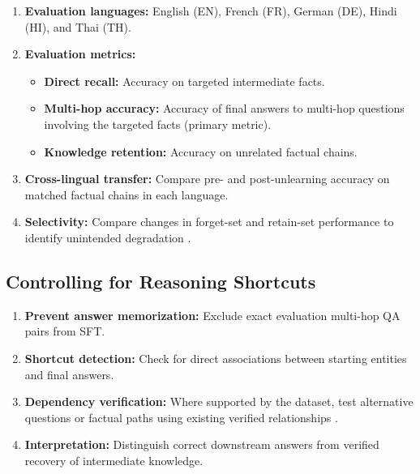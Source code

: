 \documentclass[10pt,a4paper]{article}
\begin{document}
\begin{enumerate}
    \item \textbf{Evaluation languages:}
    English (EN), French (FR), German (DE),
    Hindi (HI), and Thai (TH).

    \item \textbf{Evaluation metrics:}
    \begin{itemize}
        \item \textbf{Direct recall:}
        Accuracy on targeted intermediate facts.

        \item \textbf{Multi-hop accuracy:}
        Accuracy of final answers to multi-hop questions
        involving the targeted facts (primary metric).

        \item \textbf{Knowledge retention:}
        Accuracy on unrelated factual chains.
    \end{itemize}

    \item \textbf{Cross-lingual transfer:}
    Compare pre- and post-unlearning accuracy
    on matched factual chains in each language.

    \item \textbf{Selectivity:}
    Compare changes in forget-set and retain-set
    performance to identify unintended degradation
    \cite{maini2024tofu,thaker2025weak}.
\end{enumerate}


\subsection{Controlling for Reasoning Shortcuts}

\begin{enumerate}
    \item \textbf{Prevent answer memorization:}
    Exclude exact evaluation multi-hop QA pairs
    from SFT.

    \item \textbf{Shortcut detection:}
    Check for direct associations between
    starting entities and final answers.

    \item \textbf{Dependency verification:}
    Where supported by the dataset, test alternative
    questions or factual paths using existing
    verified relationships
    \cite{zhong2023mquake,yang2025socrates}.

    \item \textbf{Interpretation:}
    Distinguish correct downstream answers from
    verified recovery of intermediate knowledge.
\end{enumerate}
\end{document}

